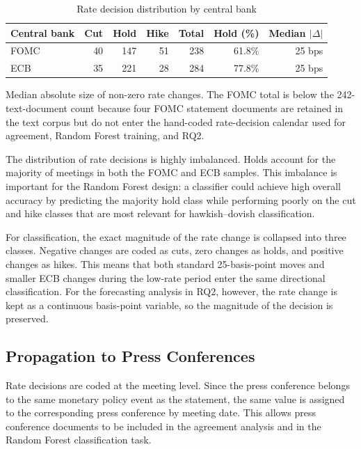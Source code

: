 \begin{table}[htbp]
\centering
\caption{Rate decision distribution by central bank}
\label{tab:rate_distribution}
\begin{threeparttable}
\begin{tabular}{lrrrrrr}
\toprule
Central bank & Cut & Hold & Hike & Total & Hold (\%) & Median $|\Delta|$\tnote{a} \\
\midrule
FOMC & 40 & 147 & 51 & 238 & 61.8\% & 25 bps \\
ECB  & 35 & 221 & 28 & 284 & 77.8\% & 25 bps \\
\bottomrule
\end{tabular}
\begin{tablenotes}\footnotesize
  \item[a] Median absolute size of non-zero rate changes. The FOMC total is below
  the 242-text-document count because four FOMC statement documents are retained in
  the text corpus but do not enter the hand-coded rate-decision calendar used for
  agreement, Random Forest training, and RQ2.
\end{tablenotes}
\end{threeparttable}
\end{table}

The distribution of rate decisions is highly imbalanced. Holds account
for the majority of meetings in both the FOMC and ECB samples. This
imbalance is important for the Random Forest design: a classifier could
achieve high overall accuracy by predicting the majority hold class while
performing poorly on the cut and hike classes that are most relevant for
hawkish--dovish classification.

For classification, the exact magnitude of the rate change is collapsed
into three classes. Negative changes are coded as cuts, zero changes as
holds, and positive changes as hikes. This means that both standard
25-basis-point moves and smaller ECB changes during the low-rate period
enter the same directional classification. For the forecasting analysis
in RQ2, however, the rate change is kept as a continuous basis-point
variable, so the magnitude of the decision is preserved.

\subsection{Propagation to Press Conferences}
\label{sec:data_rate_propagation}

Rate decisions are coded at the meeting level. Since the press conference
belongs to the same monetary policy event as the statement, the same
\bpschange{} value is assigned to the corresponding press conference by
meeting date. This allows press conference documents to be included in
the agreement analysis and in the Random Forest classification task.


